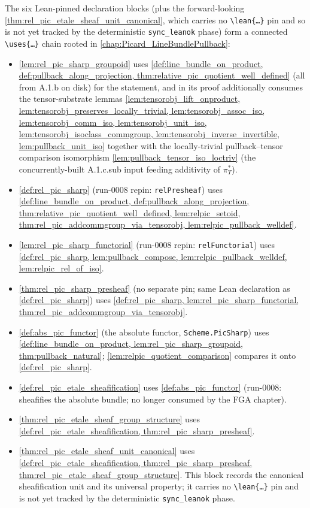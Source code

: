 The six Lean-pinned declaration blocks (plus the forward-looking
\cref{thm:rel_pic_etale_sheaf_unit_canonical}, which carries no
\texttt{\textbackslash lean\{\dots\}} pin and so is not yet tracked by
the deterministic \texttt{sync\_leanok} phase) form a connected
\texttt{\textbackslash uses\{\dots\}} chain rooted in
\cref{chap:Picard_LineBundlePullback}:
\begin{itemize}
  \item \cref{lem:rel_pic_sharp_groupoid} uses
    \cref{def:line_bundle_on_product, def:pullback_along_projection,
    thm:relative_pic_quotient_well_defined} (all from A.1.b on disk) for the
    statement, and in its proof additionally consumes the tensor-substrate
    lemmas \cref{lem:tensorobj_lift_onproduct,
    lem:tensorobj_preserves_locally_trivial, lem:tensorobj_assoc_iso,
    lem:tensorobj_comm_iso, lem:tensorobj_unit_iso,
    lem:tensorobj_isoclass_commgroup, lem:tensorobj_inverse_invertible,
    lem:pullback_unit_iso} together with the locally-trivial pullback--tensor
    comparison isomorphism \cref{lem:pullback_tensor_iso_loctriv} (the
    concurrently-built A.1.c.sub input feeding additivity of \(\pi_T^*\)).
  \item \cref{def:rel_pic_sharp} (run-0008 repin: \texttt{relPresheaf})
    uses
    \cref{def:line_bundle_on_product, def:pullback_along_projection,
    thm:relative_pic_quotient_well_defined, lem:relpic_setoid,
    thm:rel_pic_addcommgroup_via_tensorobj, lem:relpic_pullback_welldef}.
  \item \cref{lem:rel_pic_sharp_functorial} (run-0008 repin:
    \texttt{relFunctorial}) uses
    \cref{def:rel_pic_sharp, lem:pullback_compose,
    lem:relpic_pullback_welldef, lem:relpic_rel_of_iso}.
  \item \cref{thm:rel_pic_sharp_presheaf} (no separate pin; same Lean
    declaration as \cref{def:rel_pic_sharp}) uses
    \cref{def:rel_pic_sharp, lem:rel_pic_sharp_functorial,
    thm:rel_pic_addcommgroup_via_tensorobj}.
  \item \cref{def:abs_pic_functor} (the absolute functor,
    \texttt{Scheme.PicSharp}) uses
    \cref{def:line_bundle_on_product, lem:rel_pic_sharp_groupoid,
    thm:pullback_natural}; \cref{lem:relpic_quotient_comparison} compares
    it onto \cref{def:rel_pic_sharp}.
  \item \cref{def:rel_pic_etale_sheafification} uses
    \cref{def:abs_pic_functor} (run-0008: sheafifies the absolute bundle;
    no longer consumed by the FGA chapter).
  \item \cref{thm:rel_pic_etale_sheaf_group_structure} uses
    \cref{def:rel_pic_etale_sheafification, thm:rel_pic_sharp_presheaf}.
  \item \cref{thm:rel_pic_etale_sheaf_unit_canonical} uses
    \cref{def:rel_pic_etale_sheafification, thm:rel_pic_sharp_presheaf,
    thm:rel_pic_etale_sheaf_group_structure}. This block records the
    canonical sheafification unit and its universal property; it carries
    no \texttt{\textbackslash lean\{\dots\}} pin and is not yet tracked
    by the deterministic \texttt{sync\_leanok} phase.
\end{itemize}
